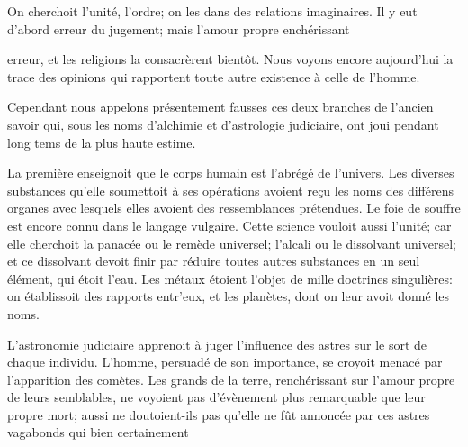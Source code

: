 \documentclass[11pt,a4paper]{article}
\begin{document}
On cherchoit l'unité, l'ordre; on les  dans des
relations imaginaires. Il y eut d'abord erreur du jugement; mais
l'amour propre enchérissant

 erreur, et les religions la consacrèrent bientôt.
 Nous voyons encore aujourd'hui la trace des
opinions qui rapportent toute autre existence à celle de l'homme.

Cependant nous appelons présentement fausses ces deux branches
 de l'ancien savoir  \struck{\ill{}} qui,
sous les noms d'alchimie et d'astrologie judiciaire, ont joui pendant
long tems de la plus haute estime.

La première enseignoit que le corps humain est l'abrégé de l'univers.
Les  diverses substances qu'elle soumettoit à ses
opérations avoient reçu  les noms des différens organes
avec lesquels elles avoient des \struck{\ill{}} ressemblances
prétendues. Le foie de souffre est encore connu dans le langage
vulgaire. Cette science vouloit  aussi l'unité; car elle
cherchoit la panacée ou le remède universel; l'alcali ou le dissolvant
universel; et ce dissolvant devoit finir par réduire toutes autres
substances en un seul élément, qui étoit l'eau. Les métaux \struck{\ill{}}
étoient l'objet de mille doctrines singulières:  on
établissoit des rapports entr'eux, et les planètes, dont on leur avoit
donné les noms.

L'astronomie judiciaire apprenoit à juger l'influence des astres sur le
sort de chaque individu. L'homme, persuadé de son importance, se croyoit
menacé par l'apparition des comètes. Les grands de la terre,
renchérissant sur l'amour propre de leurs semblables, 
ne voyoient  pas d'évènement plus remarquable que
 leur propre mort; aussi ne doutoient-ils
pas qu'elle ne fût annoncée par ces astres vagabonds qui bien
certainement
\end{document}
